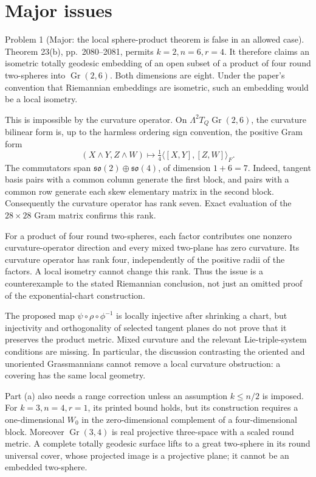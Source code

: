 \documentclass[10pt]{article}
\begin{document}
\section*{Major issues}
Problem 1 (Major: the local sphere-product theorem is false in an allowed case).  Theorem 23(b), pp. 2080–2081, permits \(k=2,n=6,r=4\). It therefore claims an isometric totally geodesic embedding of an open subset of a product of four round two-spheres into \(\mathop{\mathrm{Gr}}(2,6)\). Both dimensions are eight. Under the paper’s convention that Riemannian embeddings are isometric, such an embedding would be a local isometry.\par
This is impossible by the curvature operator. On \(\Lambda^2T_Q\mathop{\mathrm{Gr}}(2,6)\), the curvature bilinear form is, up to the harmless ordering sign convention, the positive Gram form \[(X\wedge Y,Z\wedge W)\longmapsto
          \tfrac14\langle[X,Y],[Z,W]\rangle_F.\] The commutators span \(\mathfrak{so}(2)\oplus\mathfrak{so}(4)\), of dimension \(1+6=7\). Indeed, tangent basis pairs with a common column generate the first block, and pairs with a common row generate each skew elementary matrix in the second block. Consequently the curvature operator has rank seven. Exact evaluation of the \(28\times28\) Gram matrix confirms this rank.\par
For a product of four round two-spheres, each factor contributes one nonzero curvature-operator direction and every mixed two-plane has zero curvature. Its curvature operator has rank four, independently of the positive radii of the factors. A local isometry cannot change this rank. Thus the issue is a counterexample to the stated Riemannian conclusion, not just an omitted proof of the exponential-chart construction.\par
The proposed map \(\psi\circ\rho\circ\phi^{-1}\) is locally injective after shrinking a chart, but injectivity and orthogonality of selected tangent planes do not prove that it preserves the product metric. Mixed curvature and the relevant Lie-triple-system conditions are missing. In particular, the discussion contrasting the oriented and unoriented Grassmannians cannot remove a local curvature obstruction: a covering has the same local geometry.\par
Part (a) also needs a range correction unless an assumption \(k\le n/2\) is imposed. For \(k=3,n=4,r=1\), its printed bound holds, but its construction requires a one-dimensional \(W_0\) in the zero-dimensional complement of a four-dimensional block. Moreover \(\mathop{\mathrm{Gr}}(3,4)\) is real projective three-space with a scaled round metric. A complete totally geodesic surface lifts to a great two-sphere in its round universal cover, whose projected image is a projective plane; it cannot be an embedded two-sphere.\par
\end{document}
